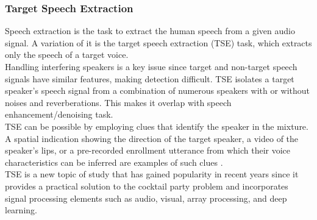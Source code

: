 \subsubsection{Target Speech Extraction}
Speech extraction is the task to extract the human speech from a given audio signal. A variation of it is the target speech extraction (TSE) task, which extracts only the speech of a target voice. \\
Handling interfering speakers is a key issue since target and non-target speech signals have similar features, making detection difficult. TSE isolates a target speaker's speech signal from a combination of numerous speakers with or without noises and reverberations. This makes it overlap with speech enhancement/denoising task. \\
TSE can be possible by employing clues that identify the speaker in the mixture. A spatial indication showing the direction of the target speaker, a video of the speaker's lips, or a pre-recorded enrollment utterance from which their voice characteristics can be inferred are examples of such clues \cite{zmolikova2023}. \\
TSE is a new topic of study that has gained popularity in recent years since it provides a practical solution to the cocktail party problem \cite{bronkhorst2015} and incorporates signal processing elements such as audio, visual, array processing, and deep learning.
